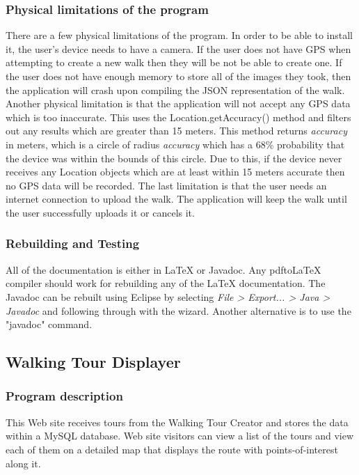 \documentclass{project}
\begin{document}
\subsubsection{Physical limitations of the program}
There are a few physical limitations of the program.
In order to be able to install it, the user's device needs to have a camera.
If the user does not have GPS when attempting to create a new walk then they will be not be able to create one.
If the user does not have enough memory to store all of the images they took, then the application will crash upon
compiling the JSON representation of the walk.
Another physical limitation is that the application will not accept any GPS data which is too inaccurate. This uses the Location.getAccuracy() method
and filters out any results which are greater than 15 meters. This method returns \textit{accuracy} in meters, which is a circle of radius \textit{accuracy}
which has a 68\% probability that the device was within the bounds of this circle.
Due to this, if the device never receives any Location objects which are at least within 15 meters accurate then no GPS data will be recorded.
The last limitation is that the user needs an internet connection to upload the walk. The application will keep the walk until the user successfully uploads
it or cancels it.

\subsubsection{Rebuilding and Testing}
All of the documentation is either in LaTeX or Javadoc. Any pdf\-to\-LaTeX compiler should work for rebuilding any of the LaTeX documentation.
The Javadoc can be rebuilt using Eclipse by selecting \textit{File \-> Export... \-> Java \-> Javadoc} and following through with the wizard.
Another alternative is to use the "javadoc" command.

\newpage

\subsection{Walking Tour Displayer}

\subsubsection{Program description}
This Web site receives tours from the Walking Tour Creator and stores the data within a MySQL database. Web site visitors can view a list of the tours and view each of them on a detailed map that displays the route with points-of-interest along it.
\end{document}

